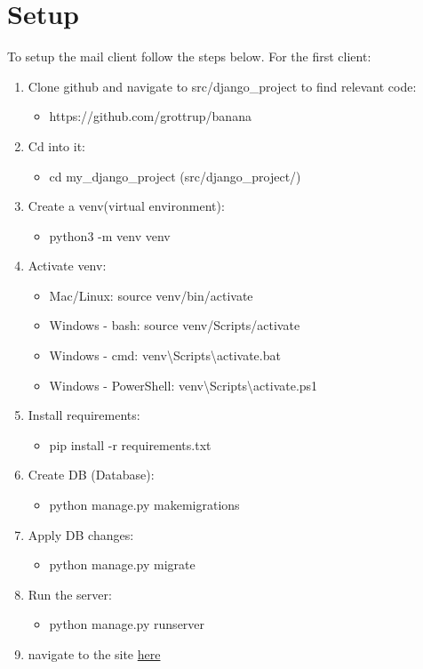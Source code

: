 \documentclass{article}
\begin{document}
\section*{Setup}
To setup the mail client follow the steps below.
For the first client:
\begin{enumerate}
    \item Clone github and navigate to src/django\_project to find relevant code:
    \begin{itemize}
        \item https://github.com/grottrup/banana
    \end{itemize}
    \item Cd into it:
    \begin{itemize}
        \item cd my\_django\_project (src/django\_project/)
    \end{itemize}
    \item Create a venv(virtual environment):
    \begin{itemize}
        \item python3 -m venv venv
    \end{itemize}
    \item Activate venv:
    \begin{itemize}
        \item Mac/Linux: source venv/bin/activate
        \item Windows - bash: source venv/Scripts/activate
        \item Windows - cmd: venv\textbackslash{}Scripts\textbackslash{}activate.bat
        \item Windows - PowerShell: venv\textbackslash{}Scripts\textbackslash{}activate.ps1
    \end{itemize}
    \item Install requirements:
    \begin{itemize}
        \item pip install -r requirements.txt
    \end{itemize}
    \item Create DB (Database):
    \begin{itemize}
        \item python manage.py makemigrations
    \end{itemize}
    \item Apply DB changes:
    \begin{itemize}
        \item python manage.py migrate
    \end{itemize}
    \item Run the server:
    \begin{itemize}
        \item python manage.py runserver
    \end{itemize}
    \item navigate to the site \href{http://127.0.0.1:8000}{here}
\end{enumerate}
\end{document}
